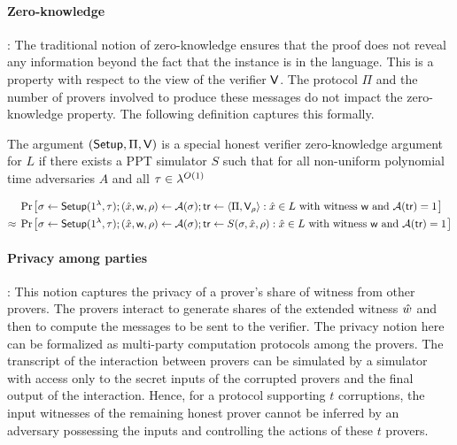 \paragraph{Zero-knowledge}: 
The traditional notion of zero-knowledge ensures that the proof does not reveal any information beyond the fact that the instance is in the language.
This is a property with respect to the view of the verifier $\mathsf{V}$. The protocol $\Pi$ and the number of provers involved to produce these messages do not impact the zero-knowledge property. The following definition captures this formally.
\begin{definition}
The argument $(\mathsf{Setup}, \Pi, \mathsf{V})$ is a special honest verifier zero-knowledge argument for $L$ if there exists a PPT simulator $S$ such that for all non-uniform polynomial time adversaries $A$ and all $\tau \in {\lambda}^{O(1)}$ 

\begin{align*}
&\prob {\sigma \leftarrow \Setup(1^\secp, \tau); (\stmt ,\wit ,\rho) \leftarrow \adv(\sigma); \tr \leftarrow \langle \Pi, \verifier_\rho \rangle: \stmt \in L \text{ with witness } \wit \text{ and } \adv(\tr)=1} \\
\approx \; &\prob{\sigma \leftarrow \Setup(1^\secp, \tau); (\stmt,\wit,\rho) \leftarrow \adv(\sigma); \tr \leftarrow S(\sigma,\stmt,\rho): \stmt \in L \text{ with witness } \wit \text{ and } \adv(\tr) = 1}
\end{align*}
\end{definition}

\paragraph{Privacy among parties}:
This notion captures the privacy of a prover's share of witness from other provers. The provers interact to generate shares of the extended witness $\hat{w}$ and then to compute the messages to be sent to the verifier. The privacy notion here can be formalized as multi-party computation protocols among the provers. The transcript of the interaction between provers can be simulated by a simulator with access only to the secret inputs of the corrupted provers and the final output of the interaction. Hence, for a protocol supporting $t$ corruptions, the input witnesses of the remaining honest prover cannot be inferred by an adversary possessing the inputs and controlling the actions of these $t$ provers.

